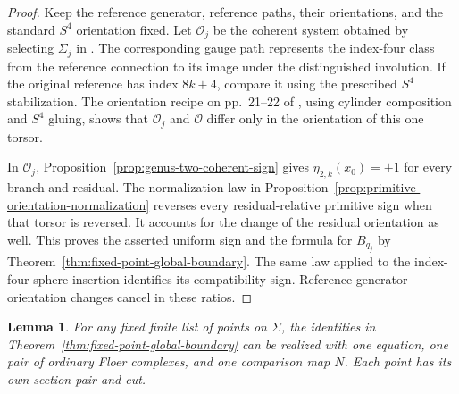 \documentclass[11pt]{amsart}
\newtheorem{lemma}[theorem]{Lemma}
\theoremstyle{definition}
\theoremstyle{remark}
\theoremstyle{plain}
\begin{document}
\begin{proof}
Keep the reference generator, reference paths, their orientations,
and the standard $S^4$ orientation fixed. Let $\mathcal O_j$
be the coherent system obtained by selecting $\Sigma_j$ in
\cite[Remark~4.76]{DaeFukLip21a}.
The corresponding gauge path represents the index-four
class from the reference connection to its image under
the distinguished involution. If the original reference
has index $8k+4$, compare it using the prescribed $S^4$
stabilization. The orientation recipe on pp.~21--22
of \cite{DaeFukLip21a}, using cylinder composition
and $S^4$ gluing, shows that $\mathcal O_j$ and
$\mathcal O$ differ only in the orientation of this
one torsor.

In $\mathcal O_j$,
Proposition~\ref{prop:genus-two-coherent-sign} gives
$\eta_{2,k}(x_0)=+1$ for every branch and residual.
The normalization law in
Proposition~\ref{prop:primitive-orientation-normalization}
reverses every residual-relative primitive sign when
that torsor is reversed. It accounts for the change
of the residual orientation as well. This proves
the asserted uniform sign and the formula for $B_{q_j}$
by Theorem~\ref{thm:fixed-point-global-boundary}.
The same law applied to the index-four sphere insertion
identifies its compatibility sign. Reference-generator
orientation changes cancel in these ratios.
\end{proof}

\begin{lemma}\label{lem:simultaneous-finite-point-cuts}
For any fixed finite list of points on $\Sigma$, the
identities in Theorem~\ref{thm:fixed-point-global-boundary}
can be realized with one equation, one pair of ordinary
Floer complexes, and one comparison map $N$.
Each point has its own section pair and cut.
\end{lemma}
\end{document}
